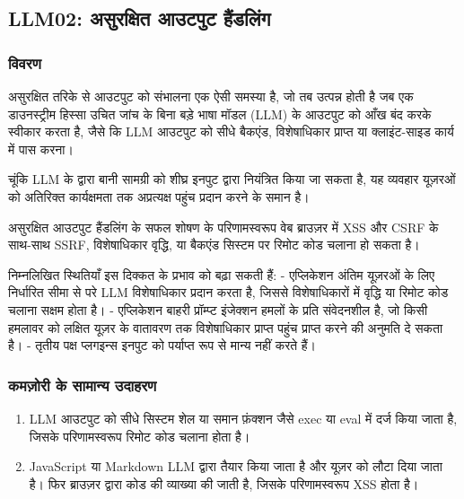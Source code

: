\documentclass[
]{article}
\author{}
\date{}
\providecommand{\tightlist}{%
  \setlength{\itemsep}{0pt}\setlength{\parskip}{0pt}}
\begin{document}
\subsection{LLM02: असुरक्षित आउटपुट
हैंडलिंग}\label{llm02-ux905ux938ux930ux915ux937ux924-ux906ux909ux91fux92aux91f-ux939ux921ux932ux917}

\subsubsection{विवरण}\label{ux935ux935ux930ux923}

असुरक्षित तरिके से आउटपुट को संभालना एक ऐसी समस्या है, जो तब उत्पन्न होती है जब एक
डाउनस्ट्रीम हिस्सा उचित जांच के बिना बड़े भाषा मॉडल (LLM) के आउटपुट को आँख बंद करके
स्वीकार करता है, जैसे कि LLM आउटपुट को सीधे बैकएंड, विशेषाधिकार प्राप्त या
क्लाइंट-साइड कार्य में पास करना।

चूंकि LLM के द्वारा बानी सामग्री को शीघ्र इनपुट द्वारा नियंत्रित किया जा सकता है,
यह व्यवहार यूज़रओं को अतिरिक्त कार्यक्षमता तक अप्रत्यक्ष पहुंच प्रदान करने के समान है।

असुरक्षित आउटपुट हैंडलिंग के सफल शोषण के परिणामस्वरूप वेब ब्राउज़र में XSS और CSRF के
साथ-साथ SSRF, विशेषाधिकार वृद्धि, या बैकएंड सिस्टम पर रिमोट कोड चलाना हो सकता
है।

निम्नलिखित स्थितियाँ इस दिक्कत के प्रभाव को बढ़ा सकती हैं: - एप्लिकेशन अंतिम यूज़रओं के
लिए निर्धारित सीमा से परे LLM विशेषाधिकार प्रदान करता है, जिससे विशेषाधिकारों में
वृद्धि या रिमोट कोड चलाना सक्षम होता है। - एप्लिकेशन बाहरी प्रॉम्प्ट इंजेक्शन हमलों के
प्रति संवेदनशील है, जो किसी हमलावर को लक्षित यूज़र के वातावरण तक विशेषाधिकार
प्राप्त पहुंच प्राप्त करने की अनुमति दे सकता है। - तृतीय पक्ष प्लगइन्स इनपुट को पर्याप्त
रूप से मान्य नहीं करते हैं।

\subsubsection{कमज़ोरी के सामान्य
उदाहरण}\label{ux915ux92eux95bux930-ux915-ux938ux92eux928ux92f-ux909ux926ux939ux930ux923}

\begin{enumerate}
\def\labelenumi{\arabic{enumi}.}
\tightlist
\item
  LLM आउटपुट को सीधे सिस्टम शेल या समान फ़ंक्शन जैसे exec या eval में दर्ज किया जाता
  है, जिसके परिणामस्वरूप रिमोट कोड चलाना होता है।
\item
  JavaScript या Markdown LLM द्वारा तैयार किया जाता है और यूज़र को लौटा दिया
  जाता है। फिर ब्राउज़र द्वारा कोड की व्याख्या की जाती है, जिसके परिणामस्वरूप XSS
  होता है।
\end{enumerate}
\end{document}
